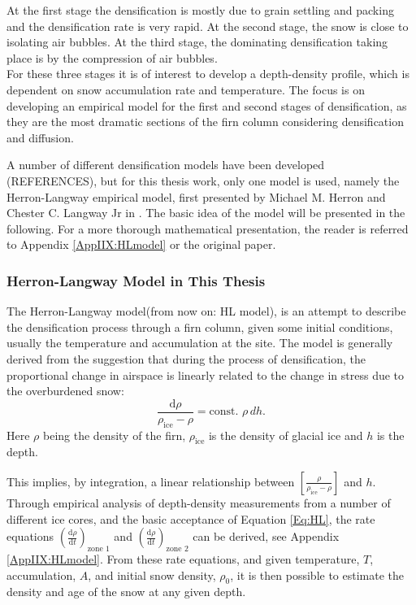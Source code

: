 \documentclass[../../CompleteThesis2/Complete_2ndDraft]{subfiles}
\begin{document}
At the first stage the densification is mostly due to grain settling and packing and the densification rate is very rapid. At the second stage, the snow is close to isolating air bubbles. At the third stage, the dominating densification taking place is by the compression of air bubbles.\\
For these three stages it is of interest to develop a depth-density profile, which is dependent on snow accumulation rate and temperature. The focus is on developing an empirical model for the first and second stages of densification, as they are the most dramatic sections of the firn column considering densification and diffusion.

A number of different densification models have been developed (REFERENCES),  but for this thesis work, only one model is used, namely the Herron-Langway empirical model, first presented by Michael M. Herron and Chester C. Langway Jr in \cite[Herron and Langway, 1980]{HerronLangway1980}. The basic idea of the model will be presented in the following. For a more thorough mathematical presentation, the reader is referred to Appendix \ref{AppIIX:HLmodel} or the original paper.

\subsubsection[HL in This Thesis]{Herron-Langway Model in This Thesis}
\label{Subsubsec:Ice_DiffusionAndDensification_Densification_HLmodel}
The Herron-Langway model(from now on: HL model), is an attempt to describe the densification process through a firn column, given some initial conditions, usually the temperature and accumulation at the site. The model is generally derived from the suggestion that during the process of densification, the proportional change in airspace is linearly related to the change in stress due to the overburdened snow:
\begin{equation}
	\frac{\text{d}\rho}{\rho_{\text{ice}} - \rho} = \text{const. } \rho \, dh.
	\label{Eq:HL}
\end{equation}
Here $\rho$ being the density of the firn, $\rho_{\text{ice}}$ is the density of glacial ice and $h$ is the depth.

This implies, by integration, a linear relationship between $\left[\frac{\rho}{\rho_{\text{ice}} - \rho}\right]$ and $h$. Through empirical analysis of depth-density measurements from a number of different ice cores, and the basic acceptance of Equation \ref{Eq:HL}, the rate equations $\left(\frac{\text{d}\rho}{\text{d}t}\right)_{\text{zone 1}}$ and $\left(\frac{\text{d}\rho}{\text{d}t}\right)_{\text{zone 2}}$ can be derived, see Appendix \ref{AppIIX:HLmodel}. From these rate equations, and given temperature, $T$, accumulation, $A$, and initial snow density, $\rho_0$, it is then possible to estimate the density and age of the snow at any given depth. 
\end{document}
